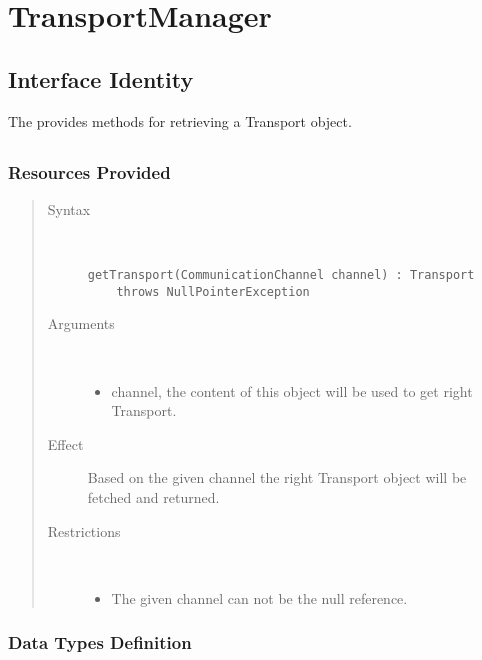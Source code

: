 \section{TransportManager}
\label{api:notification-unit-transport-manager}

\subsection{Interface Identity}

\npar The  provides methods for retrieving a
Transport object.

\subsection{}

\subsubsection{Resources Provided}

\begin{quote}
	\begin{description}
		\item[Syntax] \
		\begin{verbatim}
getTransport(CommunicationChannel channel) : Transport
    throws NullPointerException
		\end{verbatim}
		\item[Arguments] \
		\begin{itemize}
		  \item channel, the content of this object will be used to get right
		  Transport.
		\end{itemize}
		\item[Effect] Based on the given channel the right Transport object will be
		fetched and returned. 
		\item[Restrictions] \
		\begin{itemize}
		  \item The given channel can not be the null reference. 
		\end{itemize}
	\end{description} 
\end{quote}

\subsubsection{Data Types Definition}

